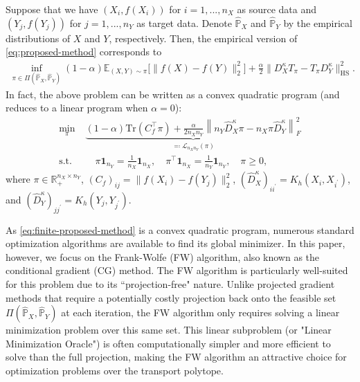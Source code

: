 \documentclass{article}
\begin{document}
Suppose that we have $(X_i,f(X_i))$ for $i=1,...,n_X$ as source data and $(Y_j,f(Y_j))$ for $j=1,...,n_Y$ as target data. Denote $\hat{\mathbb{P}}_X$ and $\hat{\mathbb{P}}_Y$ by the empirical distributions of $X$ and $Y$, respectively. Then, the empirical version of \eqref{eq:proposed-method} corresponds to
\begin{align*}
	\inf_{\pi \in \Pi(\hat{\mathbb{P}}_X,\hat{\mathbb{P}}_Y)} (1-\alpha)\mathbb{E}_{(X,Y)\sim\pi}\big[\|f(X)-f(Y)\|_2^2\big] + \frac{\alpha}{2} \| D_X^{\kappa}T_\pi - T_\pi D_Y^{\kappa} \|_{\mathrm{HS}}^2 .
\end{align*}
In fact, the above problem can be written as a convex quadratic program (and reduces to a linear program when $\alpha = 0$):
\begin{align}
	\label{eq:finite-proposed-method}
	\min_{\pi}\; &\underbrace{(1-\alpha)\mathrm{Tr}\left(C_f^\top \pi\right) + \frac{\alpha}{2n_Xn_Y} \left\| n_Y \hat{D}^{\kappa}_X \pi - n_X \pi \hat{D}^{\kappa}_Y \right\|_F^2}_{\eqqcolon \mathcal{L}_{n_Xn_Y}(\pi)} \nonumber\\
	\mathrm{s.t.}&\quad \pi\mathbf{1}_{n_Y} = \frac{1}{n_X} \mathbf{1}_{n_X} , \quad \pi^\top \mathbf{1}_{n_X} = \frac{1}{n_Y} \mathbf{1}_{n_Y} , \quad \pi \geq 0 ,
\end{align}
where $\pi \in \mathbb{R}_{+}^{n_X \times n_Y}$, $(C_f)_{ij} = \|f(X_i) - f(Y_j)\|_2^2$, $(\hat{D}^{\kappa}_X)_{ii^\prime} = K_h(X_i,X_{i^\prime})$, and $(\hat{D}^{\kappa}_Y)_{jj^\prime} = K_h(Y_j,Y_{j^\prime})$.

As \eqref{eq:finite-proposed-method} is a convex quadratic program, numerous standard optimization algorithms are available to find its global minimizer. In this paper, however, we focus on the Frank-Wolfe (FW) algorithm, also known as the conditional gradient (CG) method. The FW algorithm is particularly well-suited for this problem due to its ``projection-free" nature. Unlike projected gradient methods that require a potentially costly projection back onto the feasible set $\Pi(\hat{\mathbb{P}}_X,\hat{\mathbb{P}}_Y)$ at each iteration, the FW algorithm only requires solving a linear minimization problem over this same set. This linear subproblem (or "Linear Minimization Oracle") is often computationally simpler and more efficient to solve than the full projection, making the FW algorithm an attractive choice for optimization problems over the transport polytope.
\end{document}
